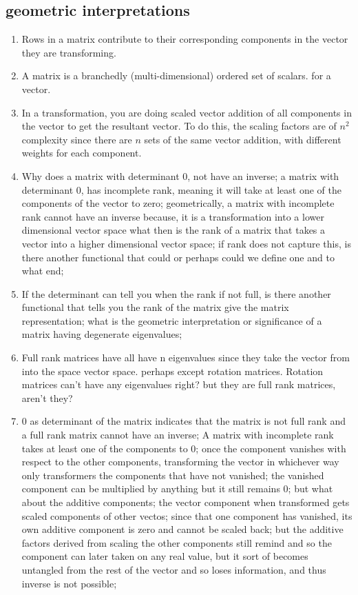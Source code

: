 \documentclass[a4paper,12pt]{amsbook}
\newcommand{\0}{{$|0\rangle$}}
\newcommand{\1}{{$|1\rangle$}}
\begin{document}
\subsection{geometric interpretations}
\begin{enumerate}
    \item Rows in a matrix contribute to their corresponding components in the vector they are transforming.
    \item A matrix is a branchedly (multi-dimensional) ordered set of scalars. for a vector.
    \item In a transformation, you are doing scaled vector addition of all components in the vector to get the resultant vector. To do this, the scaling factors are of $n^2$ complexity since there are $n$ sets of the same vector addition, with different weights for each component.
    \item Why does a matrix with determinant 0, not have an inverse; a matrix with determinant 0, has incomplete rank, meaning it will take at least one of the components of the vector to zero; geometrically, a matrix with incomplete rank cannot have an inverse because, it is a transformation into a lower dimensional vector space what then is the rank of a matrix that takes a vector into a higher dimensional vector space; if rank does not capture this, is there another functional that could or perhaps could we define one and to what end;
    \item If the determinant can tell you when the rank if not full, is there another functional that tells you the rank of the matrix give the matrix representation; what is the geometric interpretation or significance of a matrix having degenerate eigenvalues;
    \item Full rank matrices have all have n eigenvalues since they take the vector from into the space vector space. perhaps except rotation matrices. Rotation matrices can't have any eigenvalues right? but they are full rank matrices, aren't they? 
    \item 0 as determinant of the matrix indicates that the matrix is not full rank and a full rank matrix cannot have an inverse; A matrix with incomplete rank takes at least one of the components to 0; once the component vanishes with respect to the other components, transforming the vector in whichever way only transformers the components that have not vanished; the vanished component can be multiplied by anything but it still remains 0;  but what about the additive components; the vector component when transformed gets scaled components of other vectos; since that one component has vanished, its own additive component is zero and cannot be scaled back; but the additive factors derived from scaling the other components still remind and so the component can later taken on any real value, but it sort of becomes untangled from the rest of the vector and so loses information, and thus inverse is not possible;

\end{enumerate}
\end{document}
